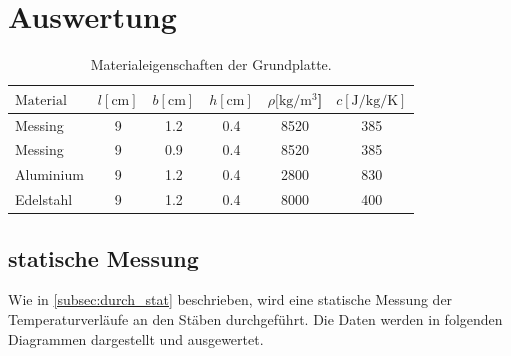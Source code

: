 \section{Auswertung}
\label{sec:Auswertung}

\begin{table}
  \centering
  \caption{Materialeigenschaften der Grundplatte. \cite{V204}}
  \label{tab:1}
  \begin{tabular}{l S S S S S }
    \toprule
    {$\text{Material}$} & {$l [\si{\centi\meter}]$} & {$b [ \si{\centi\metre}]$} & {$h[\si{\centi\metre}]$} & {$\rho [\si{\kilo\gram\per\metre\tothe{3}}$]} & {$c [\si{\joule\per\kilo\gram\per\kelvin}]$} \\
    \midrule
    Messing  & 9 & 1.2 & 0.4 & 8520 & 385 \\
    Messing  & 9 & 0.9 & 0.4 & 8520 & 385 \\
    Aluminium  & 9 & 1.2 & 0.4 & 2800 & 830 \\
    Edelstahl  & 9 & 1.2 & 0.4 & 8000 & 400 \\
    \bottomrule
  \end{tabular}
\end{table}


\subsection{statische Messung}
\label{subsec:aus_stat}
Wie in \autoref{subsec:durch_stat} beschrieben, wird eine statische Messung der Temperaturverläufe an den Stäben durchgeführt. 
Die Daten werden in folgenden Diagrammen dargestellt und ausgewertet.

